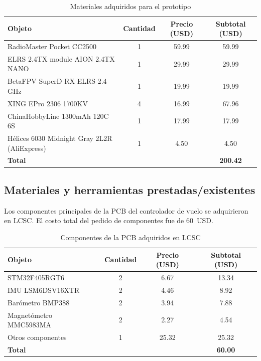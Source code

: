 \documentclass[12pt, letterpaper]{report}
\begin{document}
\begin{table}[htbp]
\centering
\caption{Materiales adquiridos para el prototipo}
\label{tab:materiales_comprados}
\renewcommand{\arraystretch}{1.3}
\setlength{\tabcolsep}{8pt}
\begin{tabularx}{\textwidth}{@{}Xccc@{}}
\toprule
\rowcolor{gray!20}
\textbf{Objeto} & \textbf{Cantidad} & \textbf{Precio (USD)} & \textbf{Subtotal (USD)} \\
\midrule
RadioMaster Pocket CC2500 & 1 & 59.99 & 59.99 \\
ELRS 2.4TX module AION 2.4TX NANO & 1 & 29.99 & 29.99 \\
BetaFPV SuperD RX ELRS 2.4\,GHz & 1 & 19.99 & 19.99 \\
XING EPro 2306 1700KV & 4 & 16.99 & 67.96 \\
ChinaHobbyLine 1300mAh 120C 6S & 1 & 17.99 & 17.99 \\
Hélices 6030 Midnight Gray 2L2R (AliExpress) & 1 & 4.50 & 4.50 \\
\midrule
\textbf{Total} & & & \textbf{200.42} \\
\bottomrule
\end{tabularx}
\end{table}

\subsection{Materiales y herramientas prestadas/existentes}

Los componentes principales de la PCB del controlador de vuelo se adquirieron en LCSC. El costo total del pedido de componentes fue de 60~USD.

\begin{table}[htbp]
\centering
\caption{Componentes de la PCB adquiridos en LCSC}
\label{tab:componentes_pcb}
\renewcommand{\arraystretch}{1.3}
\setlength{\tabcolsep}{8pt}
\begin{tabularx}{\textwidth}{@{}Xccc@{}}
\toprule
\rowcolor{gray!20}
\textbf{Objeto} & \textbf{Cantidad} & \textbf{Precio (USD)} & \textbf{Subtotal (USD)} \\
\midrule
STM32F405RGT6 & 2 & 6.67 & 13.34 \\
IMU LSM6DSV16XTR & 2 & 4.46 & 8.92 \\
Barómetro BMP388 & 2 & 3.94 & 7.88 \\
Magnetómetro MMC5983MA & 2 & 2.27 & 4.54 \\
Otros componentes & 1 & 25.32 & 25.32 \\
\midrule
\textbf{Total} & & & \textbf{60.00} \\
\bottomrule
\end{tabularx}
\end{table}
\end{document}
